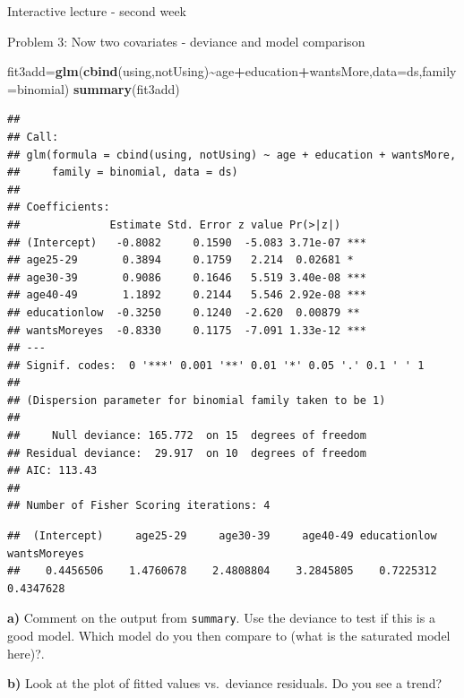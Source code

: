 \documentclass[
  ignorenonframetext,
]{beamer}
\newenvironment{Shaded}{\begin{snugshade}}{\end{snugshade}}
\newcommand{\AttributeTok}[1]{\textcolor[rgb]{0.13,0.29,0.53}{#1}}
\newcommand{\FunctionTok}[1]{\textcolor[rgb]{0.13,0.29,0.53}{\textbf{#1}}}
\newcommand{\NormalTok}[1]{#1}
\newcommand{\OtherTok}[1]{\textcolor[rgb]{0.56,0.35,0.01}{#1}}
\newcommand{\SpecialCharTok}[1]{\textcolor[rgb]{0.81,0.36,0.00}{\textbf{#1}}}
\begin{document}
\begin{frame}[fragile]{Interactive lecture - second week}
\begin{block}{Problem 3: Now two covariates - deviance and model
comparison}
\begin{Shaded}
\begin{Highlighting}[]
\NormalTok{fit3add}\OtherTok{=}\FunctionTok{glm}\NormalTok{(}\FunctionTok{cbind}\NormalTok{(using,notUsing)}\SpecialCharTok{\textasciitilde{}}\NormalTok{age}\SpecialCharTok{+}\NormalTok{education}\SpecialCharTok{+}\NormalTok{wantsMore,}\AttributeTok{data=}\NormalTok{ds,}\AttributeTok{family=}\NormalTok{binomial)}
\FunctionTok{summary}\NormalTok{(fit3add)}
\end{Highlighting}
\end{Shaded}

\begin{verbatim}
## 
## Call:
## glm(formula = cbind(using, notUsing) ~ age + education + wantsMore, 
##     family = binomial, data = ds)
## 
## Coefficients:
##              Estimate Std. Error z value Pr(>|z|)    
## (Intercept)   -0.8082     0.1590  -5.083 3.71e-07 ***
## age25-29       0.3894     0.1759   2.214  0.02681 *  
## age30-39       0.9086     0.1646   5.519 3.40e-08 ***
## age40-49       1.1892     0.2144   5.546 2.92e-08 ***
## educationlow  -0.3250     0.1240  -2.620  0.00879 ** 
## wantsMoreyes  -0.8330     0.1175  -7.091 1.33e-12 ***
## ---
## Signif. codes:  0 '***' 0.001 '**' 0.01 '*' 0.05 '.' 0.1 ' ' 1
## 
## (Dispersion parameter for binomial family taken to be 1)
## 
##     Null deviance: 165.772  on 15  degrees of freedom
## Residual deviance:  29.917  on 10  degrees of freedom
## AIC: 113.43
## 
## Number of Fisher Scoring iterations: 4
\end{verbatim}

\begin{Shaded}
\end{Shaded}

\begin{verbatim}
##  (Intercept)     age25-29     age30-39     age40-49 educationlow wantsMoreyes 
##    0.4456506    1.4760678    2.4808804    3.2845805    0.7225312    0.4347628
\end{verbatim}

\textbf{a)} Comment on the output from \texttt{summary}. Use the
deviance to test if this is a good model. Which model do you then
compare to (what is the saturated model here)?.

\textbf{b)} Look at the plot of fitted values vs.~deviance residuals. Do
you see a trend?


\end{block}
\end{frame}
\end{document}
